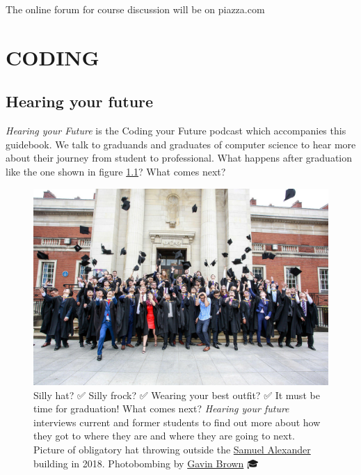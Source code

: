\documentclass[
]{book}
\begin{document}
The online forum for course discussion will be on piazza.com

\hypertarget{part-coding}{%
\part{CODING}\label{part-coding}}

\hypertarget{hearing}{%
\chapter{Hearing your future}\label{hearing}}

\emph{Hearing your Future} is the Coding your Future podcast which accompanies this guidebook. We talk to graduands and graduates of computer science to hear more about their journey from student to professional. What happens after graduation like the one shown in figure \ref{fig:graduation-fig}? What comes next?

\begin{figure}

{\centering \includegraphics[width=1\linewidth]{images/graduation2} 

}

\caption{Silly hat? ✅ Silly frock? ✅ Wearing your best outfit? ✅ It must be time for graduation! What comes next? \emph{Hearing your future} interviews current and former students to find out more about how they got to where they are and where they are going to next. Picture of obligatory hat throwing outside the \href{https://en.wikipedia.org/wiki/Samuel_Alexander}{Samuel Alexander} building in 2018. Photobombing by \href{https://profgavinbrown.github.io/}{Gavin Brown} 🎓}\label{fig:graduation-fig}
\end{figure}
\end{document}
